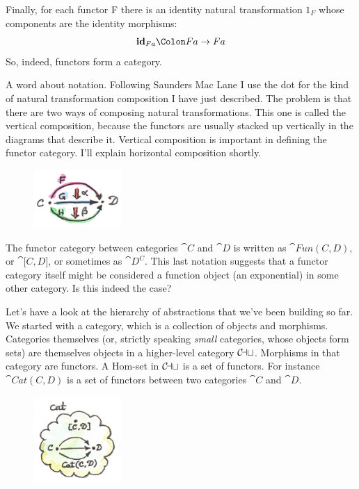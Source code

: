 Finally, for each functor F there is an identity natural transformation
$1_F$ whose components are the identity morphisms:
\[\id_{F a} \Colon F a \to F a\]
So, indeed, functors form a category.

A word about notation. Following Saunders Mac Lane I use the dot for the
kind of natural transformation composition I have just described. The
problem is that there are two ways of composing natural transformations.
This one is called the vertical composition, because the functors are
usually stacked up vertically in the diagrams that describe it. Vertical
composition is important in defining the functor category. I'll explain
horizontal composition shortly.

\begin{figure}[H]
\centering
\includegraphics[width=0.3\textwidth]{images/6a_vertical.jpg}
\end{figure}

\noindent
The functor category between categories $\cat{C}$ and $\cat{D}$ is written as
$\cat{Fun(C, D)}$, or $\cat{{[}C, D{]}}$, or sometimes as
$\cat{D^C}$. This last notation suggests that a functor category itself
might be considered a function object (an exponential) in some other
category. Is this indeed the case?

Let's have a look at the hierarchy of abstractions that we've been
building so far. We started with a category, which is a collection of
objects and morphisms. Categories themselves (or, strictly speaking
\emph{small} categories, whose objects form sets) are themselves objects
in a higher-level category $\mathcal{C\mkern-3mu at}$. Morphisms in that category are
functors. A Hom-set in $\mathcal{C\mkern-3mu at}$ is a set of functors. For instance
$\cat{Cat(C, D)}$ is a set of functors between two categories $\cat{C}$ and $\cat{D}$.

\begin{figure}[H]
\centering
\includegraphics[width=0.3\textwidth]{images/7_cathomset.jpg}
\end{figure}

